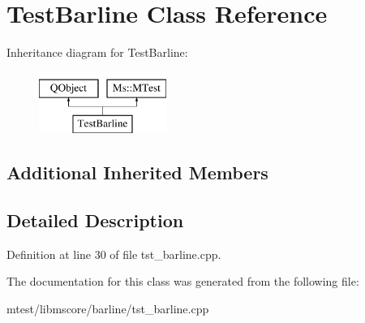 \hypertarget{class_test_barline}{}\section{Test\+Barline Class Reference}
\label{class_test_barline}
Inheritance diagram for Test\+Barline\+:\begin{figure}[H]
\begin{center}
\leavevmode
\includegraphics[height=2.000000cm]{class_test_barline}
\end{center}
\end{figure}
\subsection*{Additional Inherited Members}


\subsection{Detailed Description}


Definition at line 30 of file tst\+\_\+barline.\+cpp.



The documentation for this class was generated from the following file\+:\begin{DoxyCompactItemize}
\item 
mtest/libmscore/barline/tst\+\_\+barline.\+cpp\end{DoxyCompactItemize}
